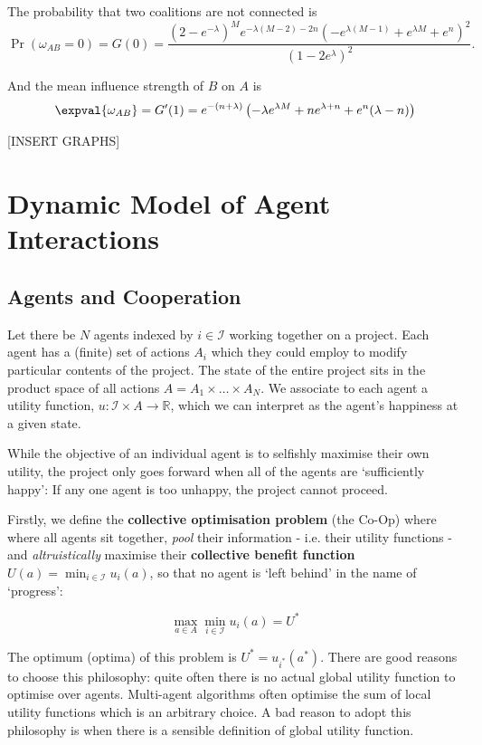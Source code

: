 The probability that two coalitions are not connected is
\begin{equation}
\Pr(\omega_{AB} = 0) = G(0) = \frac{\left(2-e^{-\lambda }\right)^M e^{-\lambda  (M-2)-2 n} \left(-e^{\lambda  (M-1)}+e^{\lambda  M}+e^n\right)^2}{\left(1-2 e^{\lambda }\right)^2}.
\end{equation}

And the mean influence strength of $B$ on $A$ is
\begin{equation}
\expval{\omega_{AB}} = G'(1)= e^{-(n+\lambda)} \left(-\lambda  e^{\lambda  M}+n e^{\lambda +n}+e^n (\lambda -n)\right)
\end{equation}

[INSERT GRAPHS]


\section{Dynamic Model of Agent Interactions}
\subsection{Agents and Cooperation}
Let there be $N$ agents indexed by $i \in \mathcal{I}$ working together on a project. Each agent has a (finite) set of actions $A_i$ which they could employ to modify particular contents of the project. The state of the entire project sits in the product space of all actions $A = A_1 \times \ldots \times A_N$.  We associate to each agent a utility function, $u : \mathcal{I} \times A \to \mathbb{R}$, which we can interpret as the agent's happiness at a given state.

While the objective of an individual agent is to selfishly maximise their own utility, the project only goes forward when all of the agents are `sufficiently happy': If any one agent is too unhappy, the project cannot proceed.

Firstly, we define the \textbf{collective optimisation problem} (the Co-Op) where where all agents sit together, \emph{pool} their information - i.e. their utility functions - and \emph{altruistically} maximise their \textbf{collective benefit function} $U(a) = \min_{i \in \mathcal{I}} u_i(a)$, so that no agent is `left behind' in the name of `progress':

\begin{equation}
\max_{a \in A} \min_{i \in \mathcal{I}} u_i(a)  = U^\ast
\end{equation}

The optimum (optima) of this problem is $U^\ast = u_{i^\ast}(a^\ast)$. There are good reasons to choose this philosophy: quite often there is no actual global utility function to optimise over agents. Multi-agent algorithms often optimise the sum of local utility functions which is an arbitrary choice. A bad reason to adopt this philosophy is when there is a sensible definition of global utility function.

